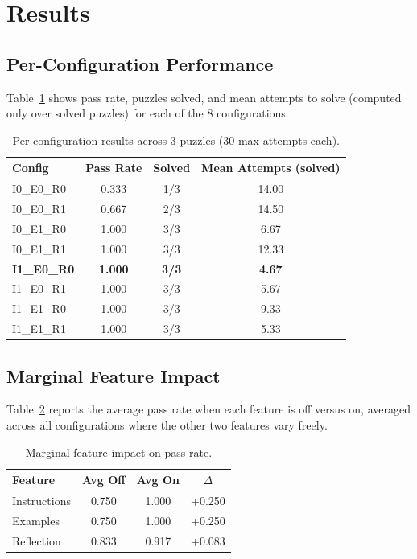 \documentclass[11pt]{article}
\begin{document}
\section{Results}\label{sec:results}

\subsection{Per-Configuration Performance}

Table~\ref{tab:config-results} shows pass rate, puzzles solved, and mean attempts to solve (computed only over solved puzzles) for each of the 8 configurations.

\begin{table}[h]
\centering
\caption{Per-configuration results across 3 puzzles (30 max attempts each).}
\label{tab:config-results}
\begin{tabular}{lccc}
\toprule
\textbf{Config} & \textbf{Pass Rate} & \textbf{Solved} & \textbf{Mean Attempts (solved)} \\
\midrule
I0\_E0\_R0 & 0.333 & 1/3 & 14.00 \\
I0\_E0\_R1 & 0.667 & 2/3 & 14.50 \\
I0\_E1\_R0 & 1.000 & 3/3 & 6.67 \\
I0\_E1\_R1 & 1.000 & 3/3 & 12.33 \\
\textbf{I1\_E0\_R0} & \textbf{1.000} & \textbf{3/3} & \textbf{4.67} \\
I1\_E0\_R1 & 1.000 & 3/3 & 5.67 \\
I1\_E1\_R0 & 1.000 & 3/3 & 9.33 \\
I1\_E1\_R1 & 1.000 & 3/3 & 5.33 \\
\bottomrule
\end{tabular}
\end{table}

\subsection{Marginal Feature Impact}

Table~\ref{tab:feature-impact} reports the average pass rate when each feature is off versus on, averaged across all configurations where the other two features vary freely.

\begin{table}[h]
\centering
\caption{Marginal feature impact on pass rate.}
\label{tab:feature-impact}
\begin{tabular}{lccc}
\toprule
\textbf{Feature} & \textbf{Avg Off} & \textbf{Avg On} & \textbf{$\Delta$} \\
\midrule
Instructions & 0.750 & 1.000 & +0.250 \\
Examples     & 0.750 & 1.000 & +0.250 \\
Reflection   & 0.833 & 0.917 & +0.083 \\
\bottomrule
\end{tabular}
\end{table}
\end{document}
